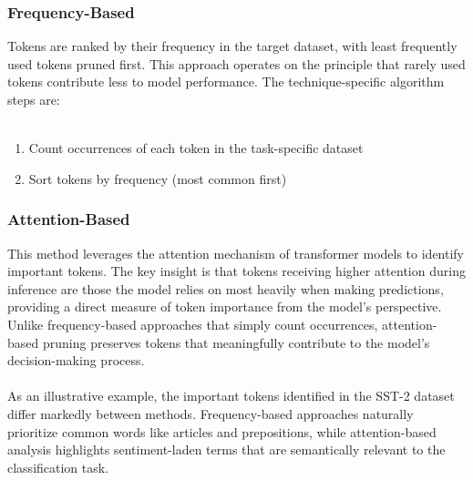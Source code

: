 \documentclass[twocolumn]{article}
\begin{document}
\subsubsection{Frequency-Based}
Tokens are ranked by their frequency in the target dataset, with least frequently used tokens pruned first. This approach operates on the principle that rarely used tokens contribute less to model performance. The technique-specific algorithm steps are:
\\ \\
\begin{enumerate}
    \item Count occurrences of each token in the task-specific dataset
    \item Sort tokens by frequency (most common first)
\end{enumerate}
\subsubsection{Attention-Based}
This method leverages the attention mechanism of transformer models to identify important tokens. The key insight is that tokens receiving higher attention during inference are those the model relies on most heavily when making predictions, providing a direct measure of token importance from the model's perspective. Unlike frequency-based approaches that simply count occurrences, attention-based pruning preserves tokens that meaningfully contribute to the model's decision-making process.
\\ \\
As an illustrative example, the important tokens identified in the SST-2 dataset differ markedly between methods. Frequency-based approaches naturally prioritize common words like articles and prepositions, while attention-based analysis highlights sentiment-laden terms that are semantically relevant to the classification task.
\end{document}
